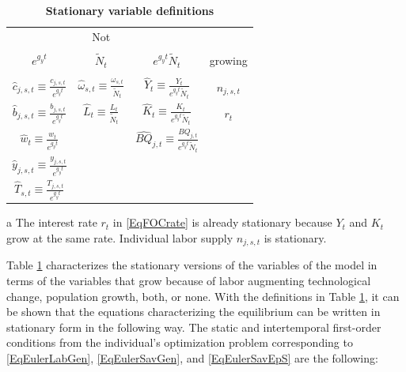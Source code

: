 \documentclass[letterpaper,12pt]{article}
\theoremstyle{definition}
\begin{document}
\begin{spacing}{1.5}
    \begin{table}[htbp] \centering \captionsetup{width=3.3in}
    \caption{\label{TabStatVars}\textbf{Stationary variable definitions}}
      \begin{threeparttable}
      \begin{tabular}{>{\small}c >{\small}c >{\small}c |>{\small}c}
        \hline\hline
        \multicolumn{3}{c}{Sources of growth} & Not \\
        & & & \\[-4mm]
        $e^{g_y t}$ & $\tilde{N}_t$ & $e^{g_y t}\tilde{N}_t$ & growing\tnote{a} \\
        \hline
        & & \\[-4mm]
        $\hat{c}_{j,s,t}\equiv\frac{c_{j,s,t}}{e^{g_y t}}$ & $\hat{\omega}_{s,t}\equiv\frac{\omega_{s,t}}{\tilde{N}_t}$ & $\hat{Y}_t\equiv\frac{Y_t}{e^{g_y t}\tilde{N}_t}$ & $n_{j,s,t}$ \\[2mm]
        $\hat{b}_{j,s,t}\equiv\frac{b_{j,s,t}}{e^{g_y t}}$ & $\hat{L}_t\equiv\frac{L_t}{\tilde{N}_t}$ & $\hat{K}_t\equiv\frac{K_t}{e^{g_y t}\tilde{N}_t}$ & $r_t$ \\[2mm]
        $\hat{w}_t\equiv\frac{w_t}{e^{g_y t}}$ &  & $\hat{BQ}_{j,t}\equiv\frac{BQ_{j,t}}{e^{g_y t}\tilde{N}_t}$ &  \\[2mm]
        $\hat{y}_{j,s,t}\equiv\frac{y_{j,s,t}}{e^{g_y t}}$ &  &  &  \\[2mm]
        $\hat{T}_{s,t}\equiv\frac{T_{j,s,t}}{e^{g_y t}}$ &  &  &  \\[2mm]
        \hline\hline
      \end{tabular}
      \begin{tablenotes}
        \scriptsize{\item[a]The interest rate $r_t$ in \eqref{EqFOCrate} is already stationary because $Y_t$ and $K_t$ grow at the same rate. Individual labor supply $n_{j,s,t}$ is stationary.}
      \end{tablenotes}
      \end{threeparttable}
    \end{table}

    Table \ref{TabStatVars} characterizes the stationary versions of the variables of the model in terms of the variables that grow because of labor augmenting technological change, population growth, both, or none. With the definitions in Table \ref{TabStatVars}, it can be shown that the equations  characterizing the equilibrium can be written in stationary form in the following way. The static and intertemporal first-order conditions from the individual's optimization problem corresponding to \eqref{EqEulerLabGen}, \eqref{EqEulerSavGen}, and \eqref{EqEulerSavEpS} are the following:


\end{spacing}
\end{document}

